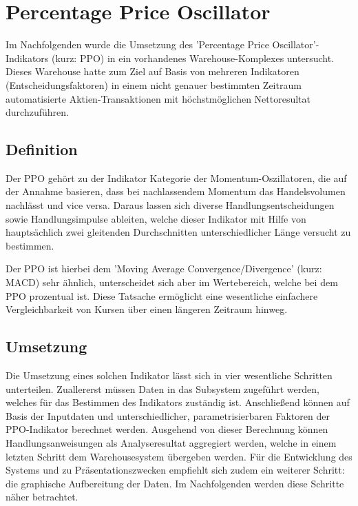 

\section{Percentage Price Oscillator}

Im Nachfolgenden wurde die Umsetzung des ’Percentage Price Oscillator’-Indikators (kurz: PPO) in ein vorhandenes Warehouse-Komplexes untersucht. Dieses Warehouse hatte zum Ziel auf Basis von mehreren Indikatoren (Entscheidungsfaktoren) in einem nicht genauer bestimmten Zeitraum automatisierte Aktien-Transaktionen mit höchstmöglichen Nettoresultat durchzuführen.

\subsection{Definition}
Der PPO gehört zu der Indikator Kategorie der Momentum-Oszil\-latoren, die auf der Annahme basieren, dass bei nachlassendem Momentum das Handelsvolumen nachlässt und vice versa. Daraus lassen sich diverse Handlungsentscheidungen sowie Handlungsimpulse ableiten, welche dieser Indikator mit Hilfe von hauptsächlich zwei gleitenden Durchschnitten unterschiedlicher Länge versucht zu bestimmen. \cite{tvWikiPpo,inoPedPpo}

Der PPO ist hierbei dem 'Moving Average Convergence/Divergence' (kurz: MACD) sehr ähnlich, unterscheidet sich aber im Wertebereich, welche bei dem PPO prozentual ist. Diese Tatsache ermöglicht eine wesentliche einfachere Vergleichbarkeit von Kursen über einen längeren Zeitraum hinweg.\cite{tvWikiMacd}

\subsection{Umsetzung}
Die Umsetzung eines solchen Indikator lässt sich in vier wesentliche Schritten unterteilen. Zuallererst müssen Daten in das Subsystem zugeführt werden, welches für das Bestimmen des Indikators zuständig ist. Anschließend können auf Basis der Inputdaten und unterschiedlicher, parametrisierbaren Faktoren der PPO-Indikator berechnet werden. Ausgehend von dieser Berechnung können Handlungsanweisungen als Analyseresultat aggregiert werden, welche in einem letzten Schritt dem Warehousesystem übergeben werden. Für die Entwicklung des Systems und zu Präsentationszwecken empfiehlt sich zudem ein weiterer Schritt: die graphische Aufbereitung der Daten. Im Nachfolgenden werden diese Schritte näher betrachtet.


